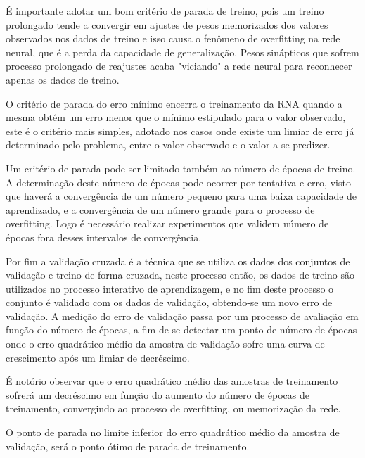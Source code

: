             	É importante adotar um bom critério de parada de treino, pois um treino prolongado tende a convergir em ajustes de pesos memorizados dos valores observados nos dados de treino e isso causa o fenômeno de overfitting na rede neural, que é a perda da capacidade de generalização. Pesos sinápticos que sofrem processo prolongado de reajustes acaba "viciando" a rede neural para reconhecer apenas os dados de treino.
            	
            	O critério de parada do erro mínimo encerra o treinamento da RNA quando a mesma obtém um erro menor que o mínimo estipulado para o valor observado, este é o critério mais simples, adotado nos casos onde existe um limiar de erro já determinado pelo problema, entre o valor observado e o valor a se predizer.
            	
            	Um critério de parada pode ser limitado também ao número de épocas de treino. A determinação  deste número de épocas pode ocorrer por tentativa e erro, visto que haverá a convergência de um número pequeno para uma baixa capacidade de aprendizado, e a convergência de um número grande para o processo de overfitting. Logo é necessário realizar experimentos que validem número de épocas fora desses intervalos de convergência.
            	
            	Por fim a validação cruzada é a técnica que se utiliza os dados dos conjuntos de validação e treino de forma cruzada, neste processo então, os dados de treino são utilizados no processo interativo de aprendizagem, e no fim deste processo o conjunto é validado com os dados de validação, obtendo-se um novo erro de validação.
            	A medição do erro de validação passa por um processo de avaliação em função do número de épocas, a fim de se detectar um ponto de número de épocas onde o erro quadrático médio da amostra de validação sofre uma curva de crescimento após um limiar de decréscimo.
            	
            	É notório observar que o erro quadrático médio das amostras de treinamento sofrerá um decréscimo em função do aumento do número de épocas de treinamento, convergindo ao processo de overfitting, ou memorização da rede.
            	
            	O ponto de parada no limite inferior do erro quadrático médio da amostra de validação, será o ponto ótimo de parada de treinamento.
          	
